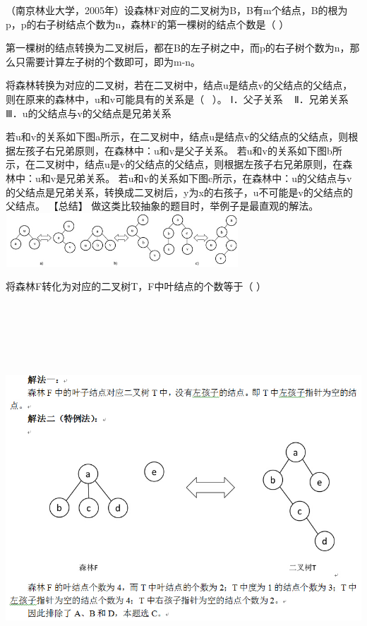 \question （南京林业大学，2005年）设森林F对应的二叉树为B，B有m个结点，B的根为p，p的右子树结点个数为n，森林F的第一棵树的结点个数是（
）
\par{}
\begin{solution}第一棵树的结点转换为二叉树后，都在B的左子树之中，而p的右子树个数为n，那么只需要计算左子树的个数即可，即为m-n。
\end{solution}
\question 将森林转换为对应的二叉树，若在二叉树中，结点u是结点v的父结点的父结点，则在原来的森林中，u和v可能具有的关系是（
~）。 Ⅰ．父子关系 ~ Ⅱ．兄弟关系 Ⅲ．u的父结点与v的父结点是兄弟关系
\par{}
\begin{solution}若u和v的关系如下图a所示，在二叉树中，结点u是结点v的父结点的父结点，则根据左孩子右兄弟原则，在森林中：u和v是父子关系。
若u和v的关系如下图b所示，在二叉树中，结点u是v的父结点的父结点，则根据左孩子右兄弟原则，在森林中：u和v是兄弟关系。
若u和v的关系如下图c所示，在森林中：u的父结点与v的父结点是兄弟关系，转换成二叉树后，y为x的右孩子，u不可能是v的父结点的父结点。
【总结】 做这类比较抽象的题目时，举例子是最直观的解法。
\includegraphics[width=3.43750in,height=0.79167in]{computerassets/c988dc89d58b0e157aa15f8cdbc93ba0.jpeg}
\end{solution}
\question 将森林F转化为对应的二叉树T，F中叶结点的个数等于（ ）
\par{}
\begin{solution}\includegraphics[width=8.31250in,height=5.72917in]{computerassets/8e82dd8ce320967b382ec04f01be2a5d.jpeg}
\end{solution}
